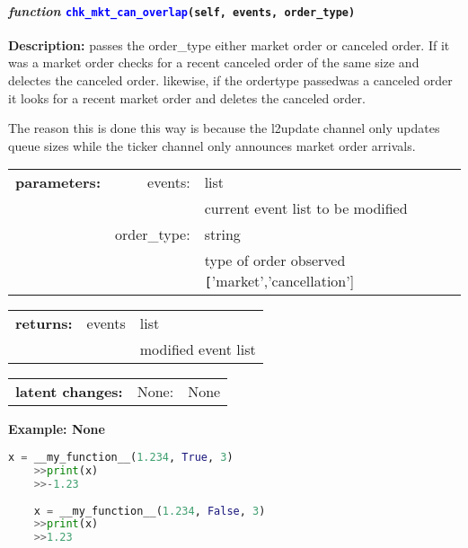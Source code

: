 \paragraph{\textit{function} \textcolor{blue}{\texttt{chk\_mkt\_can\_overlap}}\texttt{(self, events, order\_type)}}\hfill\break
\noindent \textbf{Description:} passes the order\_type either market order or canceled order. If it was a market order checks for a recent canceled order of the same size and delectes the canceled order. likewise, if the ordertype passedwas a canceled order it looks for a recent market order and deletes the canceled order. 

The reason this is done this way is because the l2update channel only updates queue sizes while the ticker channel only announces market order arrivals. 
 

\begin{tabular}{r r l }
	\textbf{parameters:}	& events: & list\\
	&  & current event list to be modified\\
	& order\_type:& string\\
	&& type of order observed \texttt['market','cancellation']\\
\end{tabular}

\begin{tabular}{l c l}
	\textbf{returns:} & events & list\\
	& & modified event list\\
\end{tabular}

\begin{tabular}{l c l}
	\textbf{latent changes:} & None: & None\\
\end{tabular}

\textbf{Example: None}
\begin{lstlisting}[language=Python]
	x = __my_function__(1.234, True, 3)
	>>print(x)
	>>-1.23
	
	x = __my_function__(1.234, False, 3)
	>>print(x)
	>>1.23
\end{lstlisting}